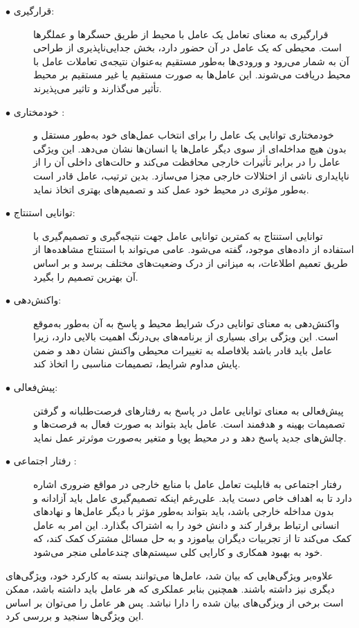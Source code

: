\begin{description}
	\item[$\bullet$ قرارگیری\footnotemark:] 
	قرارگیری به معنای تعامل یک عامل با محیط از طریق حسگرها و عملگرها است. محیطی که یک عامل در آن حضور دارد، بخش جدایی‌ناپذیری از طراحی آن به شمار می‌رود و ورودی‌ها به‌طور مستقیم به‌عنوان نتیجه‌ی تعاملات عامل با محیط دریافت می‌شوند. این عامل‌ها به صورت مستقیم یا غیر مستقیم بر محیط تأثیر می‌گذارند و تاثیر می‌پذیرند.
	\item[$\bullet$ خودمختاری \footnotemark:] 
	خودمختاری توانایی یک عامل را برای انتخاب عمل‌های خود به‌طور مستقل و بدون هیچ مداخله‌ای از سوی دیگر عامل‌ها یا انسان‌ها نشان می‌دهد. این ویژگی عامل را در برابر تأثیرات خارجی محافظت می‌کند و حالت‌های داخلی آن را از ناپایداری ناشی از اختلالات خارجی مجزا می‌سازد. بدین ترتیب، عامل قادر است به‌طور مؤثری در محیط خود عمل کند و تصمیم‌های بهتری اتخاذ نماید.
	\item[$\bullet$ توانایی استنتاج\footnotemark:] 
	توانایی استنتاج به کمترین توانایی عامل جهت نتیجه‌گیری و تصمیم‌گیری با استفاده از داده‌های موجود، گفته می‌شود. عامی می‌تواند با استنتاج مشاهده‌ها از طریق تعمیم اطلاعات، به میزانی از درک وضعیت‌های مختلف برسد و بر اساس آن بهترین تصمیم را بگیرد.
	\item[$\bullet$ واکنش‌دهی\footnotemark:] 
	واکنش‌دهی به معنای توانایی درک شرایط محیط و پاسخ به آن به‌طور به‌موقع است. این ویژگی برای بسیاری از برنامه‌های بی‌درنگ اهمیت بالایی دارد، زیرا عامل باید قادر باشد بلافاصله به تغییرات محیطی واکنش نشان دهد و ضمن پایش مداوم شرایط، تصمیمات مناسبی را اتخاذ کند.
	\item[$\bullet$ پیش‌فعالی\footnotemark:] 
	
	پیش‌فعالی به معنای توانایی عامل در پاسخ به رفتارهای فرصت‌طلبانه و گرفتن تصمیمات بهینه و هدفمند است. عامل باید بتواند به صورت فعال به فرصت‌ها و چالش‌های جدید پاسخ دهد و در محیط پویا و متغیر به‌صورت موثرتر عمل نماید.
	\item[$\bullet$ رفتار اجتماعی \footnotemark:] 
	رفتار اجتماعی به قابلیت تعامل عامل با منابع خارجی در مواقع ضروری اشاره دارد تا به اهداف خاص دست یابد. علی‌رغم اینکه تصمیم‌گیری عامل باید آزادانه و بدون مداخله خارجی باشد، باید بتواند به‌طور مؤثر با دیگر عامل‌ها و نهادهای انسانی ارتباط برقرار کند و دانش خود را به اشتراک بگذارد. این امر به عامل کمک می‌کند تا از تجربیات دیگران بیاموزد و به حل مسائل مشترک کمک کند، که خود به بهبود همکاری و کارایی کلی سیستم‌های چندعاملی منجر می‌شود.
\end{description}
علاوه‌بر ویژگی‌هایی که بیان شد، عامل‌ها می‌توانند بسته به کارکرد خود، ویژگی‌های دیگری نیز داشته باشند. همچنین بنابر عملکری که هر عامل باید داشته باشد، ممکن است برخی از ویزگی‌های بیان شده را دارا نباشد. پس هر عامل را می‌توان بر اساس این ویژگی‌ها سنجید و بررسی کرد.





